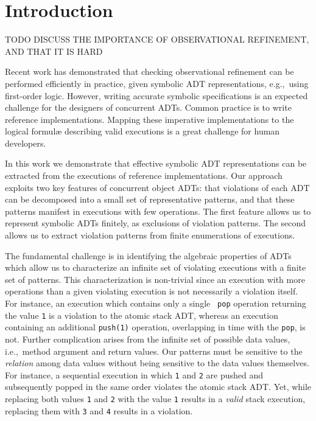 \section{Introduction}
\label{sec:intro}

TODO DISCUSS THE IMPORTANCE OF OBSERVATIONAL REFINEMENT, AND THAT IT IS HARD

Recent work has demonstrated that checking observational refinement can be
performed efficiently in practice, given symbolic ADT representations,
e.g.,~using first-order logic. However, writing accurate symbolic
specifications is an expected challenge for the designers of concurrent ADTs.
Common practice is to write reference implementations. Mapping these imperative
implementations to the logical formulæ describing valid executions is a great
challenge for human developers.

In this work we demonstrate that effective symbolic ADT representations can be
extracted from the executions of reference implementations. Our approach
exploits two key features of concurrent object ADTs: that violations of each
ADT can be decomposed into a small set of representative patterns, and that
these patterns manifest in executions with few operations. The first feature
allows us to represent symbolic ADTs finitely, as exclusions of violation
patterns. The second allows us to extract violation patterns from finite
enumerations of executions.

The fundamental challenge is in identifying the algebraic properties of ADTs
which allow us to characterize an infinite set of violating executions with a
finite set of patterns. This characterization is non-trivial since an execution
with more operations than a given violating execution is not necessarily a
violation itself. For instance, an execution which contains only a single {\tt
pop} operation returning the value {\tt 1} is a violation to the atomic stack
ADT, whereas an execution containing an additional {\tt push(1)} operation,
overlapping in time with the {\tt pop}, is not. Further complication arises
from the infinite set of possible data values, i.e.,~method argument and return
values. Our patterns must be sensitive to the \emph{relation} among data values
without being sensitive to the data values themselves. For instance, a
sequential execution in which {\tt 1} and {\tt 2} are pushed and subsequently
popped in the same order violates the atomic stack ADT. Yet, while replacing
both values {\tt 1} and {\tt 2} with the value {\tt 1} results in a
\emph{valid} stack execution, replacing them with {\tt 3} and {\tt 4} results
in a violation.

